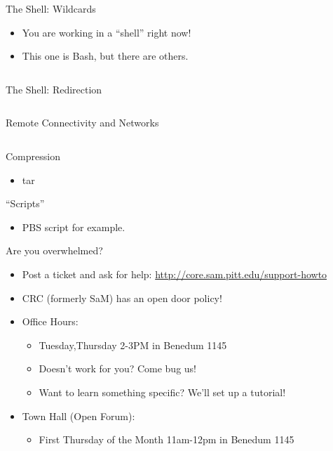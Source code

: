 \documentclass[hyperref={pdfpagelabels=false},12pt]{beamer}
\begin{document}
\begin{frame}{The Shell: Wildcards}
\begin{itemize}
    \item You are working in a ``shell'' right now!
    \item This one is Bash, but there are others.
\end{itemize}
\inputminted[bgcolor=lightgray,linenos,fontsize=\footnotesize]{bash}{code/shell-1.txt}
\end{frame}

\begin{frame}{The Shell: Redirection}
\inputminted[bgcolor=lightgray,linenos,fontsize=\footnotesize]{bash}{code/shell-2.txt}
\end{frame}

\begin{frame}{Remote Connectivity and Networks}
\inputminted[bgcolor=lightgray,linenos,fontsize=\footnotesize]{bash}{code/ssh-config-1.txt}
\end{frame}

\begin{frame}{Compression}
    \begin{itemize}
        \item tar
    \end{itemize}
\end{frame}

\begin{frame}{``Scripts''}
    \begin{itemize}
        \item PBS script for example. 
    \end{itemize}
\end{frame}

\begin{frame}{Are you overwhelmed?}
    \begin{itemize}
        \item Post a ticket and ask for help: \url{http://core.sam.pitt.edu/support-howto}
        \item CRC (formerly SaM) has an open door policy!
        \item Office Hours:
        \begin{itemize}
            \item Tuesday,Thursday 2-3PM in Benedum 1145 
            \item Doesn't work for you? Come bug us!
            \item Want to learn something specific? We'll set up a tutorial!
        \end{itemize}
        \item Town Hall (Open Forum):
        \begin{itemize}
            \item First Thursday of the Month 11am-12pm in Benedum 1145
        \end{itemize}
    \end{itemize}
\end{frame}
\end{document}
